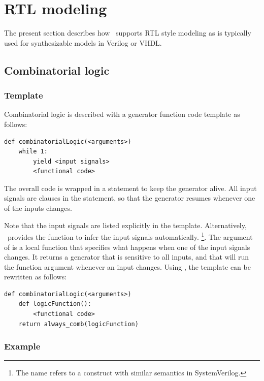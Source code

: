 \section{RTL modeling \label{model-rtl}}
The present section describes how \myhdl\ supports RTL style modeling
as is typically used for synthesizable models in Verilog or VHDL. 

\subsection{Combinatorial logic \label{model-comb}}

\subsubsection{Template \label{model-comb-templ}}
 
Combinatorial logic is described with a generator function code template as
follows: 

\begin{verbatim}
def combinatorialLogic(<arguments>)
    while 1:
        yield <input signals>
        <functional code>
\end{verbatim}

The overall code is wrapped in a  statement to keep the
generator alive. All input signals are clauses in the 
statement, so that the generator resumes whenever one of the inputs
changes.

Note that the input signals are listed explicitly in the
template. Alternatively, \myhdl\ provides the 
function to infer the input signals automatically. 
\footnote{The name  refers to
a construct with similar semantics in SystemVerilog.}.
The argument of
 is a local function that specifies
what happens when one of the input signals
changes. It returns a generator that is
sensitive to all inputs, and that will run the function argument
whenever an input changes. Using , the template
can be rewritten as follows:

\begin{verbatim}
def combinatorialLogic(<arguments>)
    def logicFunction():
        <functional code>
    return always_comb(logicFunction)
\end{verbatim}


\subsubsection{Example \label{model-comb-ex}}

